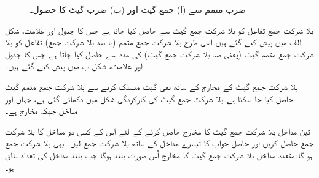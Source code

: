 \begin{figure}
\centering
\begin{subfigure}{1\textwidth}
\centering
{}
\caption{}
\end{subfigure}
\begin{subfigure}{1\textwidth}
\centering
{}
\caption{}
\end{subfigure}
\caption{ضرب متمم سے (ا) جمع گیٹ اور (ب) ضرب گیٹ کا حصول۔}
\label{شکل_بوولین_ضرب_متمم_سے_جمع_ضرب}
\end{figure}


بلا شرکت جمع تفاعل کو بلا شرکت جمع گیٹ سے حاصل کیا جاتا ہے جس کا جدول اور علامت، شکل -الف میں پیش کیے گئے ہیں۔اسی طرح بلا شرکت جمع متمم (یا ضد بلا شرکت جمع) تفاعل کو بلا شرکت جمع متمم گیٹ (یعنی ضد بلا شرکت جمع گیٹ) کی مدد سے حاصل کیا جاتا ہے جس کا جدول اور علامت، شکل-ب میں پیش کیے گئے ہیں۔

بلا شرکت جمع گیٹ کے مخارج کے ساتھ نفی گیٹ منسلک کرنے سے بلا شرکت جمع متمم گیٹ حاصل کیا جا سکتا ہے۔بلا شرکت جمع گیٹ کی کارکردگی شکل  میں دکھائی گئی ہے، جہاں  اور  مداخل جبکہ  مخارج ہے۔
	
تین مداخل بلا شرکت جمع گیٹ کا مخارج حاصل کرنے کے لئے اس کے کسی دو مداخل کا بلا شرکت جمع حاصل کریں اور حاصل جواب کا تیسرے مداخل کے ساتھ بلا شرکت جمع لیں۔ یہی بلا شرکت جمع ہو گا۔متعدد مداخل بلا شرکت جمع گیٹ کا مخارج اُس صورت بلند ہوگا جب بلند مداخل کی تعداد طاق ہو۔

